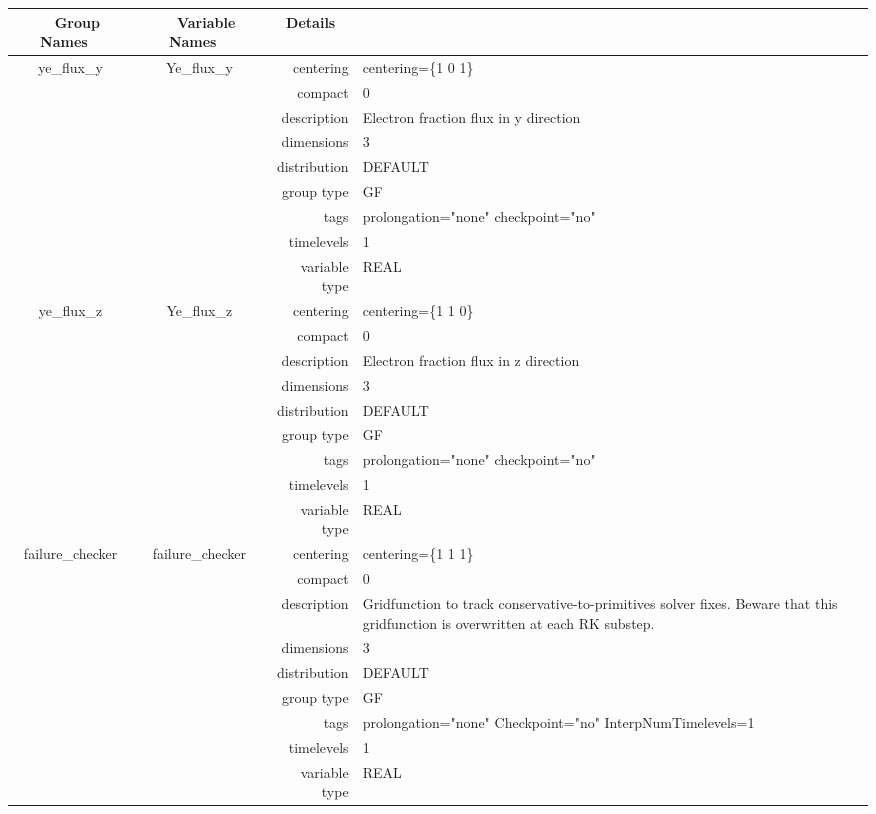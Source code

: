 \documentclass{article}
\begin{document}
\begin{tabular*}{150mm}{|c|c@{\extracolsep{\fill}}|rl|} \hline 
~ {\bf Group Names} ~ & ~ {\bf Variable Names} ~  &{\bf Details} ~ & ~ \\ 
\hline 
ye\_flux\_y & Ye\_flux\_y & centering & centering=\{1 0 1\} \\ 
 &  & compact & 0 \\ 
 &  & description & Electron fraction flux in y direction \\ 
 &  & dimensions & 3 \\ 
 &  & distribution & DEFAULT \\ 
 &  & group type & GF \\ 
 &  & tags & prolongation="none" checkpoint="no" \\ 
 &  & timelevels & 1 \\ 
 &  & variable type & REAL \\ 
\hline 
ye\_flux\_z & Ye\_flux\_z & centering & centering=\{1 1 0\} \\ 
 &  & compact & 0 \\ 
 &  & description & Electron fraction flux in z direction \\ 
 &  & dimensions & 3 \\ 
 &  & distribution & DEFAULT \\ 
 &  & group type & GF \\ 
 &  & tags & prolongation="none" checkpoint="no" \\ 
 &  & timelevels & 1 \\ 
 &  & variable type & REAL \\ 
\hline 
failure\_checker & failure\_checker & centering & centering=\{1 1 1\} \\ 
 &  & compact & 0 \\ 
 &  & description & Gridfunction to track conservative-to-primitives solver fixes. Beware that this gridfunction is overwritten at each RK substep. \\ 
 &  & dimensions & 3 \\ 
 &  & distribution & DEFAULT \\ 
 &  & group type & GF \\ 
 &  & tags & prolongation="none" Checkpoint="no" InterpNumTimelevels=1 \\ 
 &  & timelevels & 1 \\ 
 &  & variable type & REAL \\ 
\hline 
\end{tabular*} 
\end{document}

